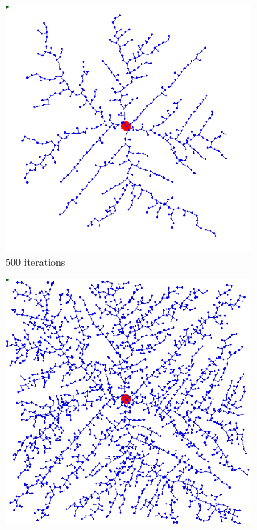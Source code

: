 \begin{figure}[]
  \centering
  \begin{subfigure}[b]{0.3\linewidth}
    \includegraphics[width=\linewidth]{images/screenshot_40.png}
     \caption{500 iterations}
  \end{subfigure}
  \hfill
  \begin{subfigure}[b]{0.3\linewidth}
    \includegraphics[width=\linewidth]{images/screenshot_41.png}

\end{subfigure}
\end{figure}
